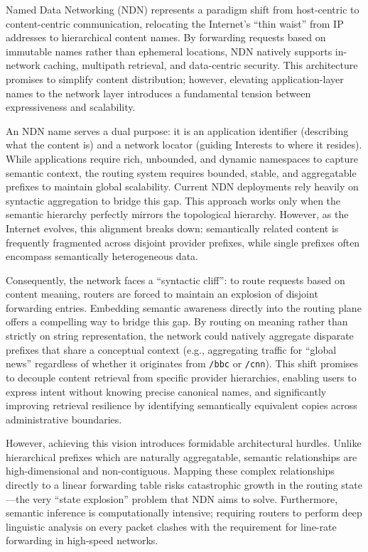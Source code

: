 \documentclass[conference]{IEEEtran}
\begin{document}
Named Data Networking (NDN)\cite{ndn} represents a paradigm shift from host-centric to content-centric communication, relocating the Internet's ``thin waist'' from IP addresses to hierarchical content names. By forwarding requests based on immutable names rather than ephemeral locations, NDN natively supports in-network caching, multipath retrieval, and data-centric security. This architecture promises to simplify content distribution; however, elevating application-layer names to the network layer introduces a fundamental tension between expressiveness and scalability.

An NDN name serves a dual purpose: it is an application identifier (describing what the content is) and a network locator (guiding Interests to where it resides). While applications require rich, unbounded, and dynamic namespaces to capture semantic context, the routing system requires bounded, stable, and aggregatable prefixes to maintain global scalability. Current NDN deployments rely heavily on syntactic aggregation to bridge this gap. This approach works only when the semantic hierarchy perfectly mirrors the topological hierarchy. However, as the Internet evolves, this alignment breaks down: semantically related content is frequently fragmented across disjoint provider prefixes, while single prefixes often encompass semantically heterogeneous data.

Consequently, the network faces a ``syntactic cliff'': to route requests based on content meaning, routers are forced to maintain an explosion of disjoint forwarding entries. Embedding semantic awareness directly into the routing plane offers a compelling way to bridge this gap. By routing on meaning rather than strictly on string representation, the network could natively aggregate disparate prefixes that share a conceptual context (e.g., aggregating traffic for ``global news'' regardless of whether it originates from \texttt{/bbc} or \texttt{/cnn}). This shift promises to decouple content retrieval from specific provider hierarchies, enabling users to express intent without knowing precise canonical names, and significantly improving retrieval resilience by identifying semantically equivalent copies across administrative boundaries.

However, achieving this vision introduces formidable architectural hurdles. Unlike hierarchical prefixes which are naturally aggregatable, semantic relationships are high-dimensional and non-contiguous. Mapping these complex relationships directly to a linear forwarding table risks catastrophic growth in the routing state---the very ``state explosion'' problem that NDN aims to solve. Furthermore, semantic inference is computationally intensive; requiring routers to perform deep linguistic analysis on every packet clashes with the requirement for line-rate forwarding in high-speed networks.
\end{document}
